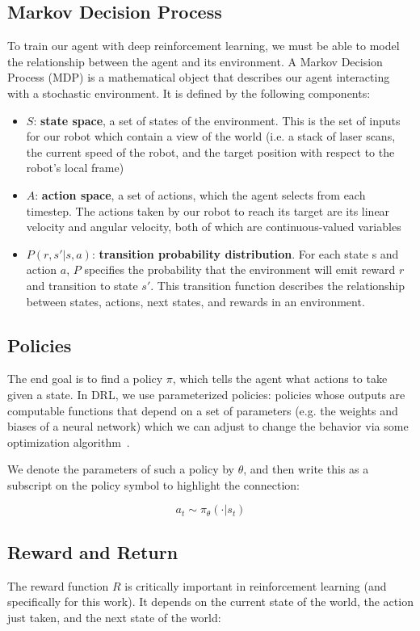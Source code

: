 \subsection{Markov Decision Process}
To train our agent with deep reinforcement learning, we must be able to model the relationship between the agent and its environment. A Markov Decision Process (MDP) is a mathematical object that describes our agent interacting with a stochastic environment. It is defined by the following components:
\begin{itemize}
\item $S$: \textbf{state space}, a set of states of the environment. This is the set of inputs for our robot which contain a view of the world (i.e. a stack of laser scans, the current speed of the robot, and the target position with respect to the robot's local frame)
\item $A$: \textbf{action space}, a set of actions, which the agent selects from each timestep. The actions taken by our robot to reach its target are its linear velocity and angular velocity, both of which are continuous-valued variables
\item $P(r, s' | s, a)$: \textbf{transition probability distribution}. For each state s and action $a$, $P$ specifies the probability that the environment will emit reward $r$ and transition to state $s'$. This transition function describes the relationship between states, actions, next states, and rewards in an environment.
\end{itemize}

\subsection{Policies}
The end goal is to find a policy $\pi$, which tells the agent what actions to take given a state. In DRL, we use parameterized policies: policies whose outputs are computable functions that depend on a set of parameters (e.g. the weights and biases of a neural network) which we can adjust to change the behavior via some optimization algorithm~\cite{SpinningUp2018}.

We denote the parameters of such a policy by $\theta$, and then write this as a subscript on the policy symbol to highlight the connection:

\begin{equation}
a_{t} \sim \pi_{\theta}(\cdot | s_{t})
\end{equation}

\subsection{Reward and Return}
\label{background:subsec:reward}
The reward function $R$ is critically important in reinforcement learning (and specifically for this work). It depends on the current state of the world, the action just taken, and the next state of the world:


